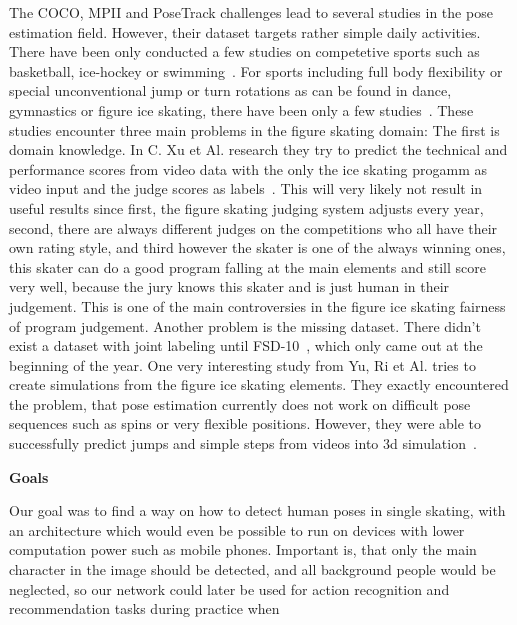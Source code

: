     The COCO, MPII and PoseTrack challenges lead to several studies in the pose estimation field.
    However, their dataset targets rather simple daily activities.
    There have been only conducted a few studies on competetive sports such as basketball, ice-hockey or
    swimming~\cite{synergetic, posehockey, swimm}.
    For sports including full body flexibility or special unconventional jump or turn rotations as can be found
    in dance, gymnastics or figure ice skating,
    there have been only a few studies~\cite{dance, figureskatingsimulation, scorefigureskating, fsd10}.
    These studies encounter three main problems in the figure skating domain:
    The first is domain knowledge.
    In C. {Xu} et Al. research they try to predict the technical and performance scores from video data with the
    only the
    ice skating progamm as video input and the judge scores as labels~\cite{scorefigureskating}.
    This will very likely not result in useful results since first, the figure skating judging system adjusts
    every year,
    second, there are always different judges on the competitions who all have their own rating style, and third
    however the skater is one of the always winning
    ones, this skater can do a good program falling at the main elements and still score very well, because the
    jury knows this skater and is just human in
    their judgement.
    This is one of the main controversies in the figure ice skating fairness of program judgement.
    Another problem is the missing dataset.
    There didn't exist a dataset with joint labeling until FSD-10~\cite{fsd10}, which only came out at the
    beginning of the year.
    One very interesting study from Yu, Ri et Al. tries to create simulations from the figure ice skating elements.
    They exactly encountered the problem, that pose estimation currently does not work on difficult pose sequences
    such as spins or very flexible positions.
    However, they were able to successfully predict jumps and simple steps from videos into 3d
    simulation~\cite{simplebaselines}.\\
\par
    \textbf{Goals} \par
    Our goal was to find a way on how to detect human poses in single skating, with an architecture which would even
    be possible to run on devices with lower computation power such as mobile phones.
    Important is, that only the main character in the image should be detected, and all background people would be
    neglected, so our network could later be used for action recognition and recommendation tasks during practice when
